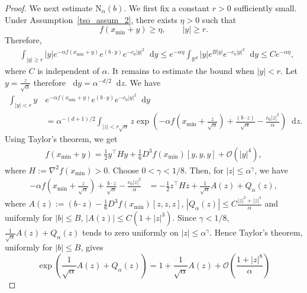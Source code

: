 \documentclass{article}
\newcommand*\der{\mathop{}\!\mathrm{d}}
\numberwithin{equation}{section}
\begin{document}
\begin{proof}
We next estimate $\mathrm{N}_\alpha(b)$. We first fix a constant $r>0$ sufficiently small. Under Assumption~\ref{tso_assum_2}, there exists $\eta>0$ such that
\begin{equation*}
    f(x_{\min}+y)\ge \eta,
    \qquad |y|\ge r.
\end{equation*}
Therefore, 
\begin{align}\label{tso_eqn_2.31}
    &\int_{|y|\ge r}
    |y|e^{-\alpha f(x_{\min}+y)}
    e^{(b\cdot y)}
    e^{-c_0|y|^2}
    \der y \leq
    e^{-\alpha\eta}
    \int_{\mathbb R^d}
    |y|e^{B|y|}e^{-c_0|y|^2}\der y
    \leq    Ce^{-\alpha\eta},
\end{align}
where $C$ is independent of $\alpha$. It remains to estimate the bound when  $|y|<r$.   Let $y = \frac{z}{\sqrt{\alpha}}$ therefore $\der y = \alpha^{-d/2} \der z $. 
We have 
\begin{align}
    \int_{|y|<r}
    y\,&e^{-\alpha f(x_{\min}+y)}
    e^{(b\cdot y)}
    e^{-c_0|y|^2}
    \der y     \nonumber \\  & =  \alpha^{-(d+1)/2}
    \int_{|z|<r\sqrt{\alpha}} z    \exp\left(
        -\alpha f\left(x_{\min}+\frac{z}{\sqrt{\alpha}}\right)+
        \frac{(b\cdot z)}{\sqrt{\alpha}} - \frac{c_0|z|^2}{\alpha}
    \right)\der z. 
    \end{align}
    Using Taylor's theorem, we get
\begin{align}
f(x_{\min}+y) = \frac{1}{2} y^\top H y + \frac{1}{6} D^3 f(x_{\min})[y,y,y] + \mathcal{O}(|y|^4),
\end{align}
where $
    H:=\nabla^2 f(x_{\min})>0$. Choose $0<\gamma<1/8$. Then, for $|z|\le \alpha^\gamma$, we have
\begin{align*}
    -\alpha f\left(x_{\min}+\frac z{\sqrt\alpha}\right) + \frac{b\cdot z}{\sqrt\alpha} -
    \frac{c_0|z|^2}{\alpha}
    &=  -\frac{1}{2} z^\top H z
    +  \frac{1}{\sqrt\alpha}A(z)
    + Q_\alpha(z),
\end{align*}
where $ A(z)
    := (b\cdot z) - \frac{1}{6} D^3f(x_{\min})[z,z,z]$, $|Q_\alpha(z)| \leq C\frac{|z|^2+|z|^4}{\alpha}$ and uniformly for $|b|\le B$, $|A(z)|\le C(1+|z|^3)$. Since $\gamma<1/8$, $\frac{1}{\sqrt\alpha}A(z) + Q_\alpha(z)$
tends to zero uniformly on $|z|\leq \alpha^\gamma$. Hence Taylor's theorem, uniformly for \(|b|\le B\), gives
\begin{equation}\label{tso_eqn_3.31}
    \exp\left(
        \frac1{\sqrt\alpha}A(z)+Q_\alpha(z)
    \right) = 1 + \frac{1}{\sqrt\alpha}A(z) +    \mathcal{O}\left(\frac{1+|z|^8}{\alpha}\right)
\end{equation}

\end{proof}
\end{document}
